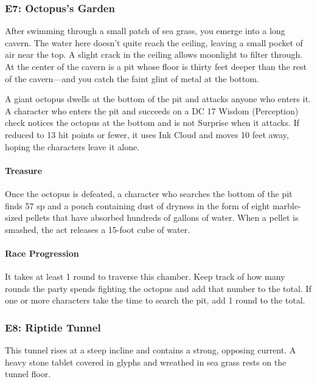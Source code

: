 \documentclass[10pt,a4paper,twoside,twocolumn,openany,nodeprecatedcode]{dndbook}
\begin{document}
  
\subsubsection{E7: Octopus's Garden}
\begin{DndReadAloud}{}
After swimming through a small patch of sea grass, you emerge into a long cavern. The water here doesn't quite reach the ceiling, leaving a small pocket of air near the top. A slight crack in the ceiling allows moonlight to filter through. At the center of the cavern is a pit whose floor is thirty feet deeper than the rest of the cavern—and you catch the faint glint of metal at the bottom.

\end{DndReadAloud}

A giant octopus dwells at the bottom of the pit and attacks anyone who enters it. A character who enters the pit and succeeds on a DC 17 Wisdom (Perception) check notices the octopus at the bottom and is not Surprise when it attacks. If reduced to 13 hit points or fewer, it uses Ink Cloud and moves 10 feet away, hoping the characters leave it alone.

\paragraph{Treasure}
Once the octopus is defeated, a character who searches the bottom of the pit finds 57 sp and a pouch containing dust of dryness in the form of eight marble-sized pellets that have absorbed hundreds of gallons of water. When a pellet is smashed, the act releases a 15-foot cube of water.

\paragraph{Race Progression}
It takes at least 1 round to traverse this chamber. Keep track of how many rounds the party spends fighting the octopus and add that number to the total. If one or more characters take the time to search the pit, add 1 round to the total.

\subsubsection{E8: Riptide Tunnel}
\begin{DndReadAloud}{}
This tunnel rises at a steep incline and contains a strong, opposing current. A heavy stone tablet covered in glyphs and wreathed in sea grass rests on the tunnel floor.

\end{DndReadAloud}
\end{document}

